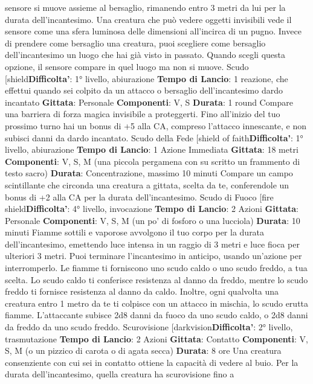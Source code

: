 \begin{multicols}{2}
sensore si muove assieme al bersaglio, rimanendo
entro 3 metri da lui per la durata dell’incantesimo. Una
creatura che può vedere oggetti invisibili vede il 
sensore come una sfera luminosa delle dimensioni
all’incirca di un pugno.
Invece di prendere come bersaglio una creatura, puoi
scegliere come bersaglio dell’incantesimo un luogo che
hai già visto in passato. Quando scegli questa opzione,
il sensore compare in quel luogo ma non si muove.
Scudo
[shield\textbf{Difficolta'}:
1° livello, abiurazione
\textbf{Tempo di Lancio}: 1 reazione, che effettui quando sei
colpito da un attacco o bersaglio dell’incantesimo dardo
incantato
\textbf{Gittata}: Personale
\textbf{Componenti}: V, S
\textbf{Durata}: 1 round
Compare una barriera di forza magica invisibile a
proteggerti. Fino all’inizio del tuo prossimo turno hai un
bonus di +5 alla CA, compreso l’attacco innescante, e
non subisci danni da dardo incantato.
Scudo della Fede
[shield of faith\textbf{Difficolta'}:
1° livello, abiurazione
\textbf{Tempo di Lancio}: 1 Azione Immediata
\textbf{Gittata}: 18 metri
\textbf{Componenti}: V, S, M (una piccola pergamena con su
scritto un frammento di testo sacro)
\textbf{Durata}: Concentrazione, massimo 10 minuti
Compare un campo scintillante che circonda una
creatura a gittata, scelta da te, conferendole un bonus
di +2 alla CA per la durata dell’incantesimo.
Scudo di Fuoco
[fire shield\textbf{Difficolta'}:
4° livello, invocazione
\textbf{Tempo di Lancio}: 2 Azioni
\textbf{Gittata}: Personale
\textbf{Componenti}: V, S, M (un po’ di fosforo o una lucciola)
\textbf{Durata}: 10 minuti
Fiamme sottili e vaporose avvolgono il tuo corpo per la
durata dell’incantesimo, emettendo luce intensa in un
raggio di 3 metri e luce fioca per ulteriori 3 metri. Puoi
terminare l’incantesimo in anticipo, usando un’azione
per interromperlo.
Le fiamme ti forniscono uno scudo caldo o uno scudo
freddo, a tua scelta. Lo scudo caldo ti conferisce
resistenza al danno da freddo, mentre lo scudo freddo ti
fornisce resistenza al danno da caldo.
Inoltre, ogni qualvolta una creatura entro 1 metro da te
ti colpisce con un attacco in mischia, lo scudo erutta
fiamme. L’attaccante subisce 2d8 danni da fuoco da
uno scudo caldo, o 2d8 danni da freddo da uno scudo
freddo.
Scurovisione
[darkvision\textbf{Difficolta'}:
2° livello, trasmutazione
\textbf{Tempo di Lancio}: 2 Azioni
\textbf{Gittata}: Contatto
\textbf{Componenti}: V, S, M (o un pizzico di carota o di agata
secca)
\textbf{Durata}: 8 ore
Una creatura consenziente con cui sei in contatto
ottiene la capacità di vedere al buio. Per la durata
dell’incantesimo, quella creatura ha scurovisione fino a

\end{multicols}

